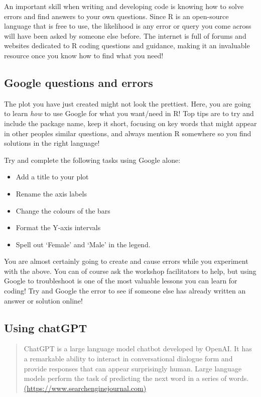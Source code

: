 \documentclass[
  12pt,
]{article}
\providecommand{\tightlist}{%
  \setlength{\itemsep}{0pt}\setlength{\parskip}{0pt}}
\begin{document}
An important skill when writing and developing code is knowing how to
solve errors and find answers to your own questions. Since R is an
open-source language that is free to use, the likelihood is any error or
query you come across will have been asked by someone else before. The
internet is full of forums and websites dedicated to R coding questions
and guidance, making it an invaluable resource once you know how to find
what you need!

\hypertarget{google-questions-and-errors}{%
\subsection{Google questions and
errors}\label{google-questions-and-errors}}

The plot you have just created might not look the prettiest. Here, you
are going to learn \emph{how} to use Google for what you want/need in R!
Top tips are to try and include the package name, keep it short,
focusing on key words that might appear in other peoples similar
questions, and always mention R somewhere so you find solutions in the
right language!

Try and complete the following tasks using Google alone:

\begin{itemize}
\tightlist
\item
  Add a title to your plot
\item
  Rename the axis labels
\item
  Change the colours of the bars
\item
  Format the Y-axis intervals
\item
  Spell out `Female' and `Male' in the legend.
\end{itemize}

You are almost certainly going to create and cause errors while you
experiment with the above. You can of course ask the workshop
facilitators to help, but using Google to troubleshoot is one of the
most valuable lessons you can learn for coding! Try and Google the error
to see if someone else has already written an answer or solution online!

\hypertarget{using-chatgpt}{%
\subsection{Using chatGPT}\label{using-chatgpt}}

\begin{quote}
ChatGPT is a large language model chatbot developed by OpenAI. It has a
remarkable ability to interact in conversational dialogue form and
provide responses that can appear surprisingly human. Large language
models perform the task of predicting the next word in a series of
words.
\href{https://www.searchenginejournal.com/what-is-chatgpt/473664/\#:~:text=ChatGPT\%20is\%20a\%20large\%20language\%20model\%20chatbot\%20developed,the\%20next\%20word\%20in\%20a\%20series\%20of\%20words.}{(https://www.searchenginejournal.com)}
\end{quote}
\end{document}
